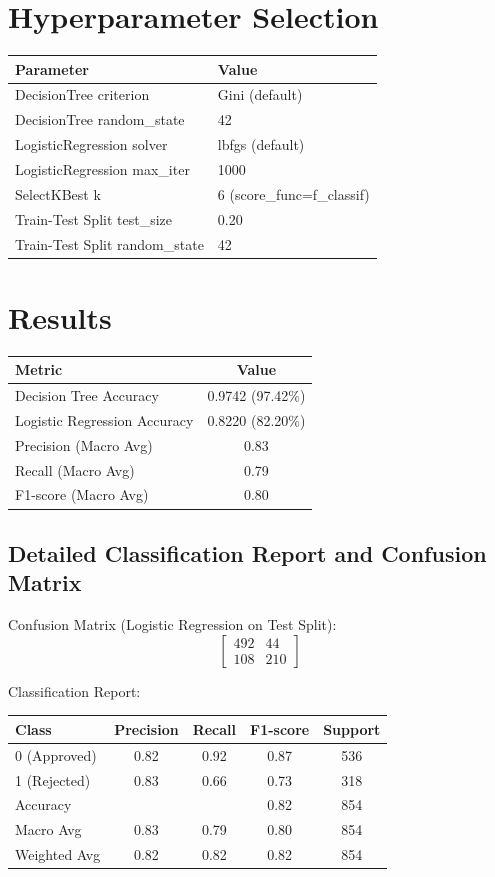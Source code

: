 \documentclass[12pt,a4paper]{article}
\begin{document}
\section{Hyperparameter Selection}

\begin{tabular}{ll}
\toprule
Parameter & Value\\
\midrule
DecisionTree criterion & Gini (default) \\
DecisionTree random\_state & 42 \\
LogisticRegression solver & lbfgs (default) \\
LogisticRegression max\_iter & 1000 \\
SelectKBest k & 6 (score\_func=f\_classif) \\
Train-Test Split test\_size & 0.20 \\
Train-Test Split random\_state & 42 \\
\bottomrule
\end{tabular}

\section{Results}

\begin{tabular}{lc}
\toprule
Metric & Value\\
\midrule
Decision Tree Accuracy & 0.9742 (97.42\%) \\
Logistic Regression Accuracy & 0.8220 (82.20\%) \\
Precision (Macro Avg) & 0.83 \\
Recall (Macro Avg) & 0.79 \\
F1-score (Macro Avg) & 0.80 \\
\bottomrule
\end{tabular}

\subsection*{Detailed Classification Report and Confusion Matrix}

Confusion Matrix (Logistic Regression on Test Split):
\begin{equation*}
\begin{bmatrix}
492 & 44 \\
108 & 210
\end{bmatrix}
\end{equation*}

Classification Report:
\begin{tabular}{lcccc}
\toprule
Class & Precision & Recall & F1-score & Support \\
\midrule
0 (Approved) & 0.82 & 0.92 & 0.87 & 536 \\
1 (Rejected) & 0.83 & 0.66 & 0.73 & 318 \\
\midrule
Accuracy & & & 0.82 & 854 \\
Macro Avg & 0.83 & 0.79 & 0.80 & 854 \\
Weighted Avg & 0.82 & 0.82 & 0.82 & 854 \\
\bottomrule
\end{tabular}
\end{document}
